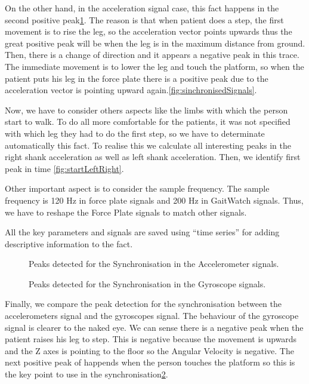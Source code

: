 On the other hand, in the acceleration signal case, this fact happens in the second positive peak\ref{fig:pointdetectionAcc}. The reason is that when patient does a step, the first movement is to rise the leg, so the acceleration vector points upwards thus the great positive peak will be when the leg is in the maximum distance from ground. Then, there is a change of direction and it appears a negative peak in this trace. The immediate movement is to lower the leg and touch the platform, so when the patient puts his leg in the force plate there is a positive peak due to the acceleration vector is pointing upward again.\ref{fig:sinchronisedSignals}.

Now, we have to consider others aspects like the limbs with which the person start to walk. To do all more comfortable for the patients, it was not specified with which leg they had to do the first step, so we have to determinate automatically this fact. To realise this we calculate all interesting peaks in the right shank acceleration as well as left shank acceleration. Then, we identify first peak in time \ref{fig:startLeftRight}.

Other important aspect is to consider the sample frequency. The sample frequency is 120 Hz in force plate signals and 200 Hz in GaitWatch signals. Thus, we have to reshape the Force Plate signals to match other signals.

All the key parameters and signals are saved using “time series”  for adding descriptive information to the fact.

\begin{figure}[H]
	\centering
	\caption{Peaks detected for the Synchronisation in the Accelerometer signals.}
	\label{fig:pointdetectionAcc}
\end{figure}

\begin{figure}[H]
	\centering
	\caption{Peaks detected for the Synchronisation in the Gyroscope signals.}
	\label{fig:pointdetectionGyro}
\end{figure}

Finally, we compare the peak detection for the synchronisation between the accelerometers signal and the gyroscopes signal. The behaviour of the gyroscope signal is clearer to the naked eye. We can sense there is a negative peak when the patient raises his leg to step. This is negative because the movement is upwards and the Z axes is pointing to the floor so the Angular Velocity is negative. The next positive peak of happends when the person touches the platform so this is the key point to use in the synchronisation\ref{fig:pointdetectionGyro}.

